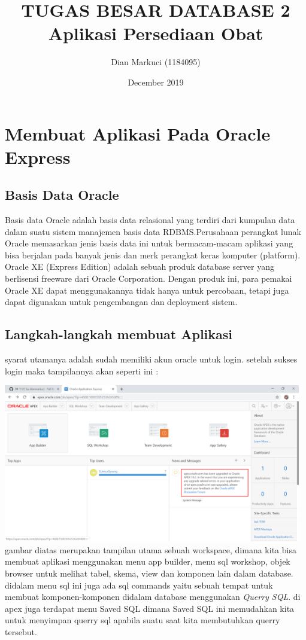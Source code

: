 \documentclass{article}
\title{TUGAS BESAR DATABASE 2 \\     
Aplikasi Persediaan Obat}
\author{Dian Markuci (1184095)}
\date{December 2019}
\begin{document}
\maketitle

\section{Membuat Aplikasi Pada Oracle Express}
\subsection{Basis Data Oracle}
Basis data Oracle adalah basis data relasional yang 
terdiri dari kumpulan data dalam suatu sistem 
manajemen basis  data  RDBMS.Perusahaan 
perangkat lunak Oracle memasarkan jenis basis data 
ini untuk bermacam-macam aplikasi yang bisa 
berjalan  pada  banyak  jenis  dan  merk  perangkat 
keras komputer (platform). Oracle XE (Express Edition) adalah sebuah produk database server yang berlisensi freeware dari Oracle Corporation. Dengan produk ini, para pemakai Oracle XE dapat menggunakannya tidak hanya untuk percobaan, tetapi juga dapat digunakan untuk pengembangan dan deployment sistem. 

\subsection{Langkah-langkah membuat Aplikasi}
syarat utamanya adalah sudah memiliki akun oracle untuk login. setelah sukses login maka tampilannya akan seperti ini :

\includegraphics[width=13cm]{figure/1.png}
gambar diatas merupakan tampilan utama sebuah workspace, dimana kita bisa membuat aplikasi menggunakan menu app builder, menu sql workshop, objek browser untuk melihat tabel, skema, view dan komponen lain dalam database. didalam menu sql ini juga ada sql commands yaitu sebuah tempat untuk membuat komponen-komponen didalam database menggunakan \textit{Querry SQL}. di apex juga terdapat menu Saved SQL dimana Saved SQL ini memudahkan kita untuk menyimpan querry sql apabila suatu saat kita membutuhkan querry tersebut. 
\end{document}
